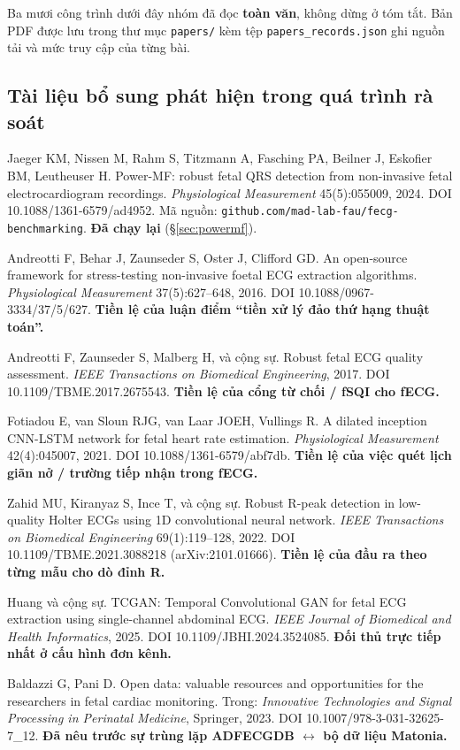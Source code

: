 Ba mươi công trình dưới đây nhóm đã đọc \textbf{toàn văn}, không dừng ở tóm tắt. Bản PDF được lưu trong
thư mục \texttt{papers/} kèm tệp \texttt{papers\_records.json} ghi nguồn tải và mức truy cập của từng bài.



\subsection*{Tài liệu bổ sung phát hiện trong quá trình rà soát}

\begin{enumerate}[leftmargin=1.6em,itemsep=2pt,label={[\arabic*]},start=31]
\item Jaeger KM, Nissen M, Rahm S, Titzmann A, Fasching PA, Beilner J, Eskofier BM, Leutheuser H.
Power-MF: robust fetal QRS detection from non-invasive fetal electrocardiogram recordings.
\textit{Physiological Measurement} 45(5):055009, 2024. DOI 10.1088/1361-6579/ad4952.
Mã nguồn: \texttt{github.com/mad-lab-fau/fecg-benchmarking}. \textbf{Đã chạy lại} (\S\ref{sec:powermf}).
\item Andreotti F, Behar J, Zaunseder S, Oster J, Clifford GD. An open-source framework for stress-testing
non-invasive foetal ECG extraction algorithms. \textit{Physiological Measurement} 37(5):627--648, 2016.
DOI 10.1088/0967-3334/37/5/627. \textbf{Tiền lệ của luận điểm ``tiền xử lý đảo thứ hạng thuật toán''.}
\item Andreotti F, Zaunseder S, Malberg H, và cộng sự. Robust fetal ECG quality assessment.
\textit{IEEE Transactions on Biomedical Engineering}, 2017. DOI 10.1109/TBME.2017.2675543.
\textbf{Tiền lệ của cổng từ chối / fSQI cho fECG.}
\item Fotiadou E, van Sloun RJG, van Laar JOEH, Vullings R. A dilated inception CNN-LSTM network for fetal
heart rate estimation. \textit{Physiological Measurement} 42(4):045007, 2021.
DOI 10.1088/1361-6579/abf7db. \textbf{Tiền lệ của việc quét lịch giãn nở / trường tiếp nhận trong fECG.}
\item Zahid MU, Kiranyaz S, Ince T, và cộng sự. Robust R-peak detection in low-quality Holter ECGs using
1D convolutional neural network. \textit{IEEE Transactions on Biomedical Engineering} 69(1):119--128, 2022.
DOI 10.1109/TBME.2021.3088218 (arXiv:2101.01666). \textbf{Tiền lệ của đầu ra theo từng mẫu cho dò đỉnh R.}
\item Huang và cộng sự. TCGAN: Temporal Convolutional GAN for fetal ECG extraction using single-channel
abdominal ECG. \textit{IEEE Journal of Biomedical and Health Informatics}, 2025.
DOI 10.1109/JBHI.2024.3524085. \textbf{Đối thủ trực tiếp nhất ở cấu hình đơn kênh.}
\item Baldazzi G, Pani D. Open data: valuable resources and opportunities for the researchers in fetal
cardiac monitoring. Trong: \textit{Innovative Technologies and Signal Processing in Perinatal Medicine},
Springer, 2023. DOI 10.1007/978-3-031-32625-7\_12. \textbf{Đã nêu trước sự trùng lặp ADFECGDB
$\leftrightarrow$ bộ dữ liệu Matonia.}
\end{enumerate}

